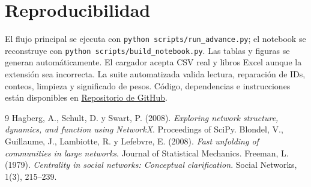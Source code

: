 \documentclass[11pt]{article}
\newcommand{\repo}{\href{https://github.com/DanielBarillasM/Laboratorio-6.-Analitica-de-Redes-Sociales_Grupo-1_DS_Sec-10}{Repositorio de GitHub}}
\begin{document}
\section{Reproducibilidad}

El flujo principal se ejecuta con \texttt{python scripts/run\_advance.py}; el notebook se reconstruye con \texttt{python scripts/build\_notebook.py}. Las tablas y figuras se generan automáticamente. El cargador acepta CSV real y libros Excel aunque la extensión sea incorrecta. La suite automatizada valida lectura, reparación de IDs, conteos, limpieza y significado de pesos. Código, dependencias e instrucciones están disponibles en \repo.

\begin{thebibliography}{9}
 Hagberg, A., Schult, D. y Swart, P. (2008). \emph{Exploring network structure, dynamics, and function using NetworkX}. Proceedings of SciPy.
 Blondel, V., Guillaume, J., Lambiotte, R. y Lefebvre, E. (2008). \emph{Fast unfolding of communities in large networks}. Journal of Statistical Mechanics.
 Freeman, L. (1979). \emph{Centrality in social networks: Conceptual clarification}. Social Networks, 1(3), 215--239.
\end{thebibliography}
\end{document}

